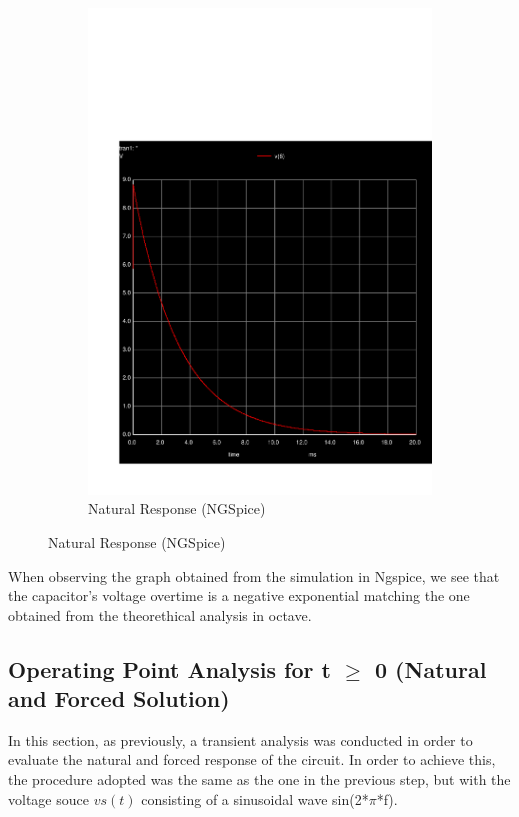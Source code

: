 \begin{figure}[H]
\begin{subfigure}{0.25\textwidth}
\includegraphics[width=\textwidth]{sim_3.pdf}
\caption{Natural Response (NGSpice)}
\label{fig:second}
\end{subfigure}
\end{figure}
 
 When observing the graph obtained from the simulation in Ngspice, we see that the capacitor's voltage overtime is a negative exponential matching the one obtained from the theorethical analysis in octave.
 
 
\subsection{Operating Point Analysis for t $\geq$ 0 (Natural and Forced Solution)}
In this section, as previously, a transient analysis was conducted in order to evaluate the natural and forced response of the circuit. In order to achieve this, the procedure adopted was the same as the one in the previous step, but with the voltage souce $vs(t)$ consisting of a sinusoidal wave sin(2*$\pi$*f).  

